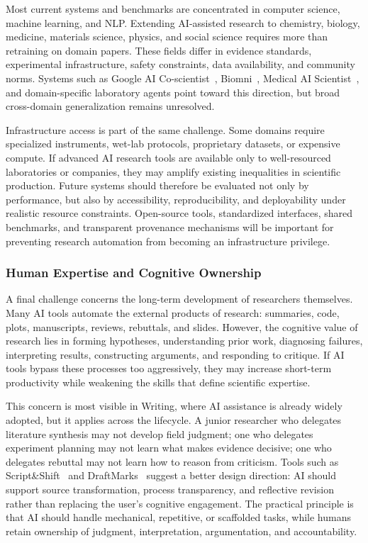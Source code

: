 \documentclass{llmxive}
\begin{document}
Most current systems and benchmarks are concentrated in computer science, machine learning, and NLP. Extending AI-assisted research to chemistry, biology, medicine, materials science, physics, and social science requires more than retraining on domain papers. These fields differ in evidence standards, experimental infrastructure, safety constraints, data availability, and community norms. Systems such as Google AI Co-scientist~\cite{gottweis2025aicoscientist}, Biomni~\cite{biomni2025}, Medical AI Scientist~\cite{medicalaiscientist2026}, and domain-specific laboratory agents point toward this direction, but broad cross-domain generalization remains unresolved.

Infrastructure access is part of the same challenge. Some domains require specialized instruments, wet-lab protocols, proprietary datasets, or expensive compute. If advanced AI research tools are available only to well-resourced laboratories or companies, they may amplify existing inequalities in scientific production. Future systems should therefore be evaluated not only by performance, but also by accessibility, reproducibility, and deployability under realistic resource constraints. Open-source tools, standardized interfaces, shared benchmarks, and transparent provenance mechanisms will be important for preventing research automation from becoming an infrastructure privilege.


\subsubsection{Human Expertise and Cognitive Ownership}

A final challenge concerns the long-term development of researchers themselves. Many AI tools automate the external products of research: summaries, code, plots, manuscripts, reviews, rebuttals, and slides. However, the cognitive value of research lies in forming hypotheses, understanding prior work, diagnosing failures, interpreting results, constructing arguments, and responding to critique. If AI tools bypass these processes too aggressively, they may increase short-term productivity while weakening the skills that define scientific expertise.

This concern is most visible in Writing, where AI assistance is already widely adopted, but it applies across the lifecycle. A junior researcher who delegates literature synthesis may not develop field judgment; one who delegates experiment planning may not learn what makes evidence decisive; one who delegates rebuttal may not learn how to reason from criticism. Tools such as Script\&Shift~\cite{siddiqui2025scriptshift} and DraftMarks~\cite{siddiqui2025draftmarks} suggest a better design direction: AI should support source transformation, process transparency, and reflective revision rather than replacing the user's cognitive engagement. The practical principle is that AI should handle mechanical, repetitive, or scaffolded tasks, while humans retain ownership of judgment, interpretation, argumentation, and accountability.
\end{document}
